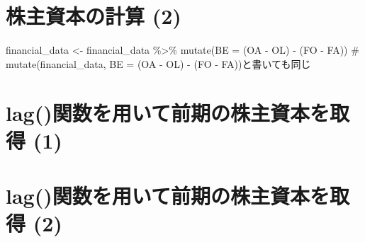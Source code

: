\documentclass[
  letterpaper,
  DIV=11,
  numbers=noendperiod]{scrreprt}
\newenvironment{Shaded}{\begin{snugshade}}{\end{snugshade}}
\newcommand{\AttributeTok}[1]{\textcolor[rgb]{0.40,0.45,0.13}{#1}}
\newcommand{\CommentTok}[1]{\textcolor[rgb]{0.37,0.37,0.37}{#1}}
\newcommand{\FunctionTok}[1]{\textcolor[rgb]{0.28,0.35,0.67}{#1}}
\newcommand{\NormalTok}[1]{\textcolor[rgb]{0.00,0.23,0.31}{#1}}
\newcommand{\OtherTok}[1]{\textcolor[rgb]{0.00,0.23,0.31}{#1}}
\newcommand{\SpecialCharTok}[1]{\textcolor[rgb]{0.37,0.37,0.37}{#1}}
\begin{document}
\section{株主資本の計算
(2)}\label{ux682aux4e3bux8cc7ux672cux306eux8a08ux7b97-2}

\begin{Shaded}
\begin{Highlighting}[]
\NormalTok{financial\_data }\OtherTok{\textless{}{-}}\NormalTok{ financial\_data }\SpecialCharTok{\%\textgreater{}\%}
  \FunctionTok{mutate}\NormalTok{(}\AttributeTok{BE =}\NormalTok{ (OA }\SpecialCharTok{{-}}\NormalTok{ OL) }\SpecialCharTok{{-}}\NormalTok{ (FO }\SpecialCharTok{{-}}\NormalTok{ FA)) }\CommentTok{\# mutate(financial\_data, BE = (OA {-} OL) {-} (FO {-} FA))と書いても同じ}
\end{Highlighting}
\end{Shaded}

\section{lag()関数を用いて前期の株主資本を取得
(1)}\label{lagux95a2ux6570ux3092ux7528ux3044ux3066ux524dux671fux306eux682aux4e3bux8cc7ux672cux3092ux53d6ux5f97-1}

\begin{Shaded}
\end{Shaded}

\section{lag()関数を用いて前期の株主資本を取得
(2)}\label{lagux95a2ux6570ux3092ux7528ux3044ux3066ux524dux671fux306eux682aux4e3bux8cc7ux672cux3092ux53d6ux5f97-2}

\begin{Shaded}
\end{Shaded}
\end{document}
